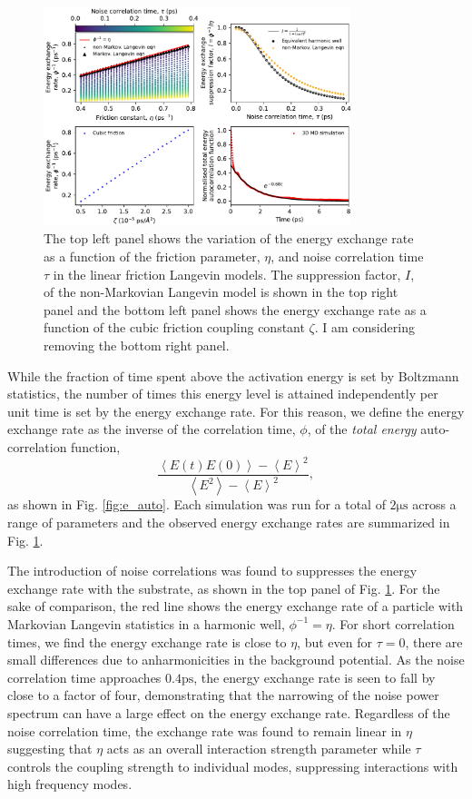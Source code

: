 \documentclass[7pt]{article}
\newcommand{\ps}{\si{\pico\second}}
\newcommand{\us}{\si{\micro\second}}
\begin{document}
\begin{figure}
	\centering
	\includegraphics[width=0.8\textwidth]{energy_exchange_rates}
	\caption{The top left panel shows the variation of the energy exchange rate as a function of the friction parameter, $\eta$, and noise correlation time $\tau$ in the linear friction Langevin models. The suppression factor, $I$, of the non-Markovian Langevin model is shown in the top right panel and the bottom left panel shows the energy exchange rate as a function of the cubic friction coupling constant $\zeta$. I am considering removing the bottom right panel.}
	\label{fig:energy_exchange_rates}
\end{figure}

While the fraction of time spent above the activation energy is set by Boltzmann statistics, the number of times this energy level is attained independently per unit time is set by the energy exchange rate. For this reason, we define the energy exchange rate as the inverse of the correlation time, $\phi$, of the \emph{total energy} auto-correlation function, $$\frac{\left<E(t)E(0)\right> - \left<E\right>^2}{\left<E^2\right> - \left<E\right>^2},$$ as shown in Fig. \ref{fig:e_auto}. Each simulation was run for a total of $2\us$ across a range of parameters and the observed energy exchange rates are summarized in Fig. \ref{fig:energy_exchange_rates}. 
 
The introduction of noise correlations was found to suppresses the energy exchange rate with the substrate, as shown in the top panel of Fig. \ref{fig:energy_exchange_rates}. For the sake of comparison, the red line shows the energy exchange rate of a particle with Markovian Langevin statistics in a harmonic well, $\phi^{-1}=\eta$. For short correlation times, we find the energy exchange rate is close to $\eta$, but even for $\tau=0$, there are small differences due to anharmonicities in the background potential. As the noise correlation time approaches $0.4\ps$, the energy exchange rate is seen to fall by close to a factor of four, demonstrating that the narrowing of the noise power spectrum can have a large effect on the energy exchange rate. Regardless of the noise correlation time, the exchange rate was found to remain linear in $\eta$ suggesting that $\eta$ acts as an overall interaction strength parameter while $\tau$ controls the coupling strength to individual modes, suppressing interactions with high frequency modes. 
\end{document}
